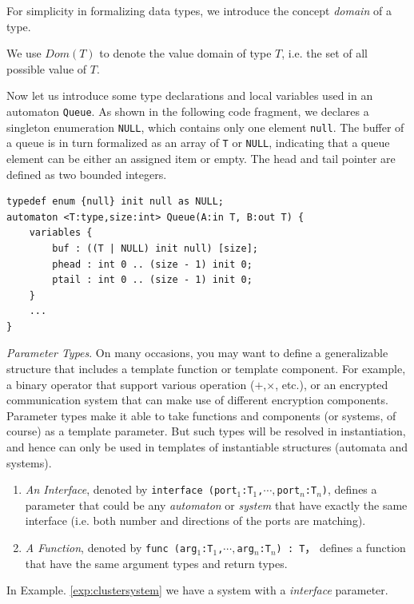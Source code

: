 For simplicity in formalizing data types, we introduce the concept \emph{domain} of a type. 

\begin{formalization}[Domain]
    We use $Dom(T)$ to denote the value domain of type $T$, i.e. the set of all possible value of $T$.
\end{formalization}

\begin{example} Now let us introduce some type declarations and local variables used in an automaton \texttt{Queue}. As shown in the following code fragment, we declares a singleton enumeration \texttt{NULL}, which contains only one element \texttt{null}. The buffer of a queue is in turn formalized as an array of \texttt{T} or \texttt{NULL}, indicating that a queue element can be either an assigned item or empty. The head and tail pointer are defined as two bounded integers.
\begin{lstlisting}
typedef enum {null} init null as NULL;
automaton <T:type,size:int> Queue(A:in T, B:out T) {
    variables {
        buf : ((T | NULL) init null) [size];
        phead : int 0 .. (size - 1) init 0;
        ptail : int 0 .. (size - 1) init 0;
    }
    ...
}
\end{lstlisting}
\label{exp:typeinqueue}
\end{example}

\noindent\emph{Parameter Types}. On many occasions, you may want to define a generalizable structure that includes a template function or template component. For example, a binary operator that support various operation ($+$,$\times$, etc.), or an encrypted communication system that can make use of different encryption components. Parameter types make it able to take functions and components (or systems, of course) as a template parameter. But such types will be resolved in instantiation, and hence can only be used in templates of instantiable structures (automata and systems). 
\begin{enumerate}
    \item \emph{An Interface}, denoted by \texttt{interface (port$_1$:T$_1$,$\cdots,$port$_n$:T$_n$)}, defines a parameter that could be any \emph{automaton} or \emph{system} that have exactly the same interface (i.e. both number and directions of the ports are matching).
    \item \emph{A Function}, denoted by \texttt{func (arg$_1$:T$_1$,$\cdots, $arg$_n$:T$_n$) : T}， defines a function that have the same argument types and return types.
\end{enumerate}
In Example. \ref{exp:clustersystem} we have a system with a \emph{interface} parameter.

